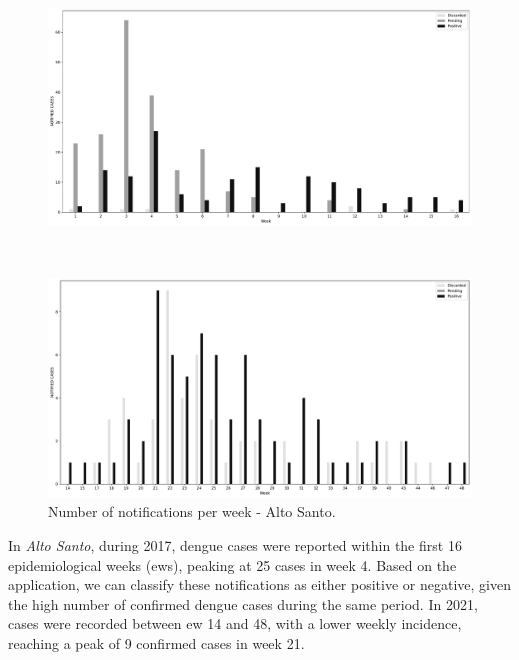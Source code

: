 \begin{figure}[ht!]
	\begin{minipage}[c]{.9\textwidth}
		\centering
		\includegraphics[scale=0.32]{images/cases-per-week-2017-Alto Santo.pdf}
	\end{minipage}
	\\
	\begin{minipage}[c]{.9\textwidth}
		\centering
		\includegraphics[scale=0.32]{images/cases-per-week-2021-Alto Santo.pdf}
	\end{minipage}
	\caption{\label{fig:cases-per-week-as} Number of notifications per week - Alto
		Santo.}
\end{figure}


In \textit{Alto Santo}, during 2017, dengue cases were reported within the first
16 epidemiological weeks (\gls{ews}), peaking at 25 cases in week 4. Based on
the application, we can classify these notifications as either positive or
negative, given the high number of confirmed dengue cases during the same
period. In 2021, cases were recorded between \gls{ew} 14 and 48, with a lower
weekly incidence, reaching a peak of 9 confirmed cases in week 21.

